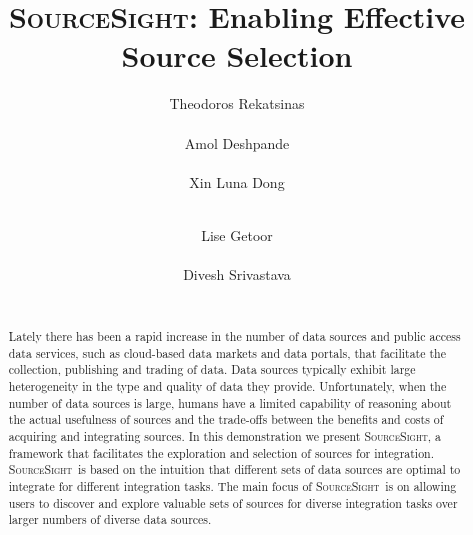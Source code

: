 \documentclass{vldb}
\newcommand\system{\textsc{SourceSight}}
\begin{document}

\title{{\LARGE \system}: Enabling Effective Source Selection}


\author{
\alignauthor
Theodoros Rekatsinas\\
       \\
\alignauthor
Amol Deshpande\\
       \\
\alignauthor 
Xin Luna Dong\\
       \\
\and  %
\alignauthor 
Lise Getoor\\
       \\
\alignauthor Divesh Srivastava\\
       \\
}

\maketitle

\begin{abstract}
Lately there has been a rapid increase in the number of data sources and public access data services, such as cloud-based data markets and data portals, that facilitate the collection, publishing and trading of data. Data sources typically exhibit large heterogeneity in the type and quality of data they provide. Unfortunately, when the number of data sources is large, humans have a limited capability of reasoning about the actual usefulness of sources and the trade-offs between the benefits and costs of acquiring and integrating sources. In this demonstration we present \system, a framework that facilitates the exploration and selection of sources for integration. \system~is based on the intuition that different sets of data sources are optimal to integrate for different integration tasks. The main focus of \system~is on allowing users to discover and explore valuable sets of sources for diverse integration tasks over larger numbers of diverse data sources.
\end{abstract}
\end{document}
